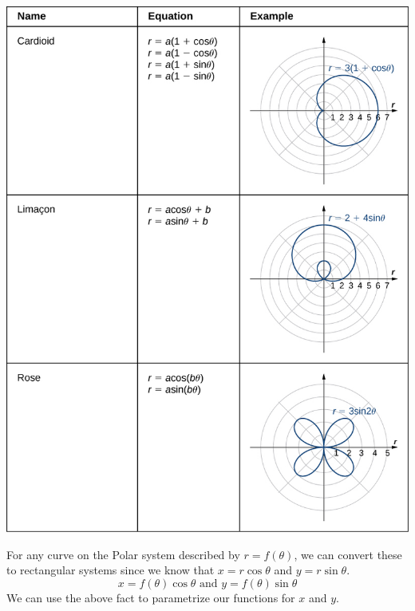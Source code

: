 \documentclass[12pt,addpoints]{exam}
\begin{document}
\begin{center}
		\includegraphics[scale=1.00]{polar_curves-2.png}
	\end{center}
	For any curve on the Polar system described by $r=f(\theta)$, we can convert these to rectangular systems since we know that $x=r\cos \theta$ and $y=r\sin \theta$.
	$$x=f( \theta )\cos \theta \text{ and } y=f( \theta )\sin \theta$$	
	We can use the above fact to parametrize our functions for $x$ and $y$.
\end{document}
